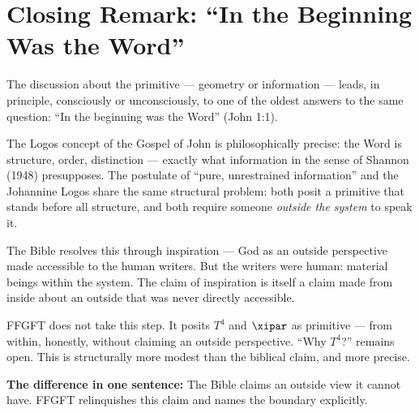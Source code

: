 \section*{Closing Remark: ``In the Beginning Was the Word''}

The discussion about the primitive --- geometry or information --- leads, in principle, consciously or unconsciously, to one of the oldest answers to the same question: ``In the beginning was the Word'' (John 1:1).

The Logos concept of the Gospel of John is philosophically precise: the Word is structure, order, distinction --- exactly what information in the sense of Shannon (1948) presupposes. The postulate of ``pure, unrestrained information'' and the Johannine Logos share the same structural problem: both posit a primitive that stands before all structure, and both require someone \emph{outside the system} to speak it.

The Bible resolves this through inspiration --- God as an outside perspective made accessible to the human writers. But the writers were human: material beings within the system. The claim of inspiration is itself a claim made from inside about an outside that was never directly accessible.

FFGFT does not take this step. It posits $T^4$ and $\xipar$ as primitive --- from within, honestly, without claiming an outside perspective. ``Why $T^4$?'' remains open. This is structurally more modest than the biblical claim, and more precise.

\begin{erkenntnis}
\textbf{The difference in one sentence:} The Bible claims an outside view it cannot have. FFGFT relinquishes this claim and names the boundary explicitly.
\end{erkenntnis}


